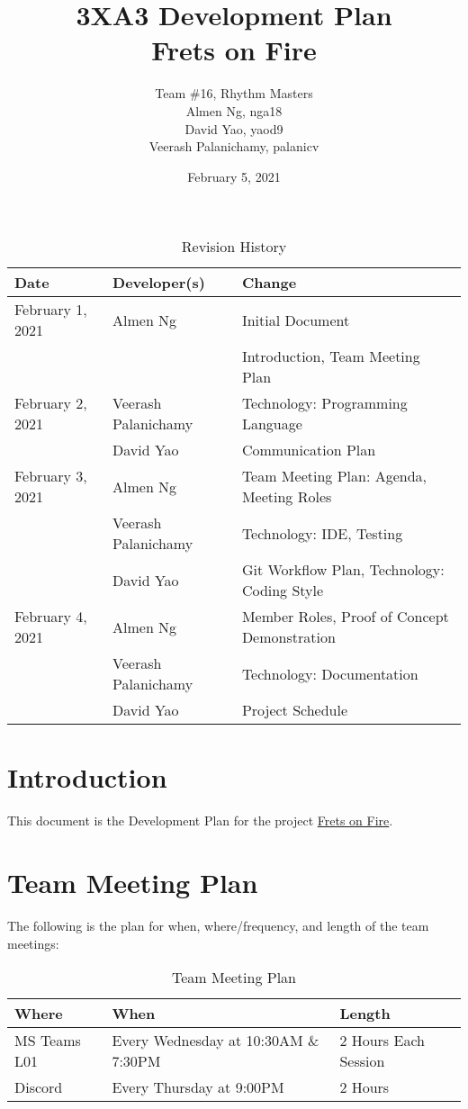 \documentclass[12pt,letterpaper]{article}
\title{3XA3 Development Plan\\ Frets on Fire}
\author{Team \#16, Rhythm Masters
    \\ Almen Ng, nga18
    \\ David Yao, yaod9
    \\ Veerash Palanichamy, palanicv}
\date{February 5, 2021}
\begin{document}
\sloppy
\maketitle
\newpage

\begin{table}[hp]
\caption{Revision History} \label{TblRevisionHistory}
\begin{tabularx}{\textwidth}{llX}
\toprule
\textbf{Date} & \textbf{Developer(s)} & \textbf{Change}\\
\midrule
February 1, 2021    & Almen Ng              & Initial Document\\
                    &                       & Introduction, Team Meeting Plan\\
February 2, 2021    & Veerash Palanichamy   & Technology: Programming Language\\
                    & David Yao             & Communication Plan\\
February 3, 2021    & Almen Ng              & Team Meeting Plan: Agenda, Meeting Roles\\
                    & Veerash Palanichamy   & Technology: IDE, Testing\\
                    & David Yao             & Git Workflow Plan, Technology: Coding Style\\
February 4, 2021    & Almen Ng              & Member Roles, Proof of Concept Demonstration\\
                    & Veerash Palanichamy   & Technology: Documentation\\
                    & David Yao             & Project Schedule\\
\bottomrule
\end{tabularx}
\end{table}

\newpage
\tableofcontents

\newpage
\listoftables

\newpage
\section{Introduction}
This document is the Development Plan for the project \href{https://github.com/skyostil/fretsonfire}{Frets on Fire}.

\section{Team Meeting Plan}

The following is the plan for when, where/frequency, and length of the team meetings:
\begin{table}[hp]
\begin{tabularx}{\textwidth}{|l|l|X|}
\toprule
\textbf{Where} & \textbf{When} & \textbf{Length}\\
\midrule
MS Teams L01 & Every Wednesday at 10:30AM \& 7:30PM & 2 Hours Each Session\\
Discord & Every Thursday at 9:00PM & 2 Hours\\
\bottomrule
\end{tabularx}
\caption{Team Meeting Plan} \label{tab:teamMeetingPlan}
\end{table}
\end{document}
